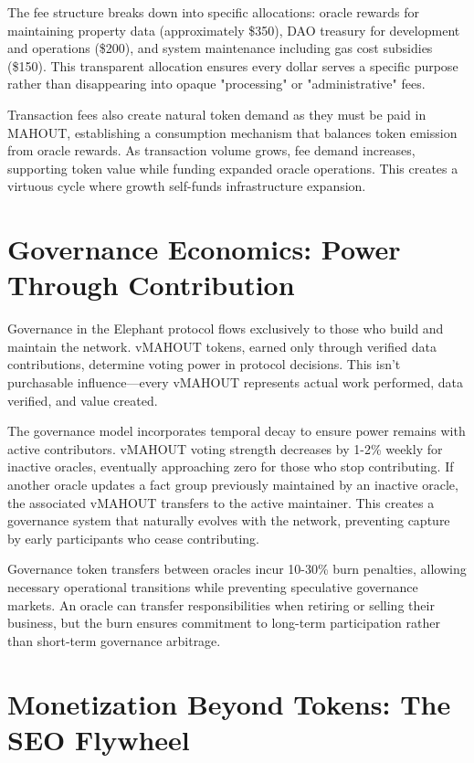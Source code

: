 The fee structure breaks down into specific allocations: oracle rewards for maintaining property data (approximately \$350), DAO treasury for development and operations (\$200), and system maintenance including gas cost subsidies (\$150). This transparent allocation ensures every dollar serves a specific purpose rather than disappearing into opaque "processing" or "administrative" fees.

Transaction fees also create natural token demand as they must be paid in MAHOUT, establishing a consumption mechanism that balances token emission from oracle rewards. As transaction volume grows, fee demand increases, supporting token value while funding expanded oracle operations. This creates a virtuous cycle where growth self-funds infrastructure expansion.

\section{Governance Economics: Power Through Contribution}

Governance in the Elephant protocol flows exclusively to those who build and maintain the network. vMAHOUT tokens, earned only through verified data contributions, determine voting power in protocol decisions. This isn't purchasable influence—every vMAHOUT represents actual work performed, data verified, and value created.

The governance model incorporates temporal decay to ensure power remains with active contributors. vMAHOUT voting strength decreases by 1-2\% weekly for inactive oracles, eventually approaching zero for those who stop contributing. If another oracle updates a fact group previously maintained by an inactive oracle, the associated vMAHOUT transfers to the active maintainer. This creates a governance system that naturally evolves with the network, preventing capture by early participants who cease contributing.

Governance token transfers between oracles incur 10-30\% burn penalties, allowing necessary operational transitions while preventing speculative governance markets. An oracle can transfer responsibilities when retiring or selling their business, but the burn ensures commitment to long-term participation rather than short-term governance arbitrage.

\section{Monetization Beyond Tokens: The SEO Flywheel}

